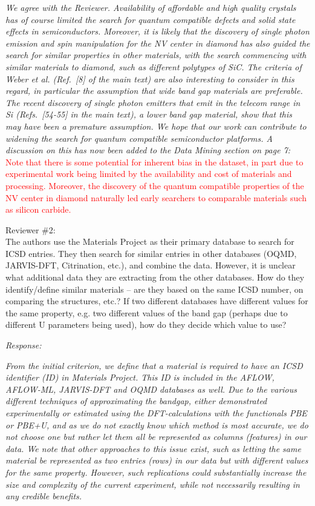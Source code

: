 \documentclass[11pt, a4paper]{letter} %
\newcommand{\mrk}[1]{\textcolor{red}{#1}}
\begin{document}
\textit{We agree with the Reviewer. Availability of affordable and high quality crystals has of course limited the search for quantum compatible defects and solid state effects in semiconductors. Moreover, it is likely that the discovery of single photon emission and spin manipulation for the NV center in diamond has also guided the search for similar properties in other materials, with the search commencing with similar materials to diamond, such as different polytypes of SiC. The criteria of Weber et al. (Ref.~[8] of the main text) are also interesting to consider in this regard, in particular the assumption that wide band gap materials are preferable. The recent discovery of single photon emitters that emit in the telecom range in Si (Refs.~[54-55] in the main text), a lower band gap material, show that this may have been a premature assumption. We hope that our work can contribute to widening the search for quantum compatible semiconductor platforms. 
A discussion on this has now been added to the Data Mining section on page 7: } \\ 
\mrk{Note that there is some potential for inherent bias in the dataset, in part due to experimental work being limited by the availability and cost of materials and processing. Moreover, the discovery of the quantum compatible properties of the NV center in diamond naturally led early searchers to comparable materials such as silicon carbide. }

Reviewer \#2: \\
The authors use the Materials Project as their primary database to search for ICSD entries. They then search for similar entries in other databases (OQMD, JARVIS-DFT, Citrination, etc.), and combine the data. However, it is unclear what additional data they are extracting from the other databases. How do they identify/define similar materials – are they based on the same ICSD number, on comparing the structures, etc.? If two different databases have different values for the same property, e.g. two different values of the band gap (perhaps due to different U parameters being used), how do they decide which value to use?

\textit{Response:}

\textit{From the initial criterion, we define that a material is required to have an ICSD identifier (ID) in Materials Project. This ID is included in the AFLOW, AFLOW-ML, JARVIS-DFT and OQMD databases as well. Due to the various different techniques of approximating the bandgap, either demonstrated experimentally or estimated using the DFT-calculations with the functionals PBE or PBE+U, and as we do not exactly know which method is most accurate, we do not choose one but rather let them all be represented as columns (features) in our data. 
We note that other approaches to this issue  exist, such as letting the same material be represented as two entries (rows) in our data but with different values for the same property. However, such replications could substantially increase the size and complexity of the current experiment, while not necessarily resulting in any credible benefits.} 
\end{document}

